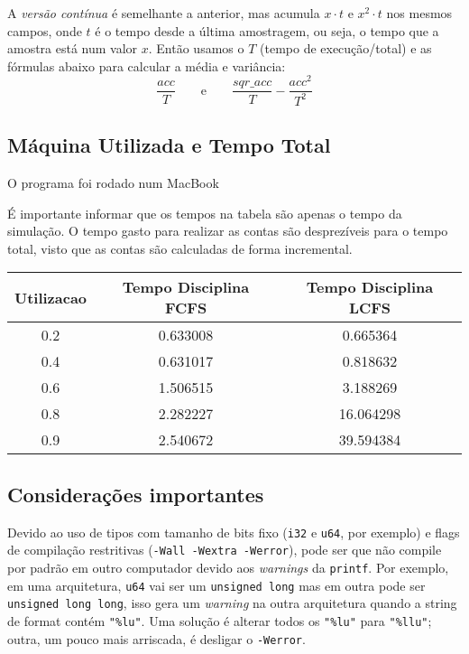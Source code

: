 \documentclass[a4paper]{article}
\newcommand{\inlcode}{\texttt}
\begin{document}
A \emph{versão contínua} é semelhante a anterior,
mas acumula \(x \cdot t\) e \(x^2 \cdot t\) nos mesmos campos,
onde \(t\) é
o tempo desde a última amostragem, ou seja,
o tempo que a amostra está num valor \(x\).
Então usamos o \(T\) (tempo de execução/total)
e as fórmulas abaixo para calcular a média e variância:
\[
    \frac{acc}{T}
    \qquad\text{e}\qquad
    \frac{sqr\_acc}{T} - \frac{acc^2}{T^2}
\]

\subsection{Máquina Utilizada e Tempo Total}
O programa foi rodado num MacBook

É importante informar que os tempos na tabela são apenas o tempo da simulação. O tempo gasto para realizar as contas são desprezíveis para o tempo total, visto que as contas são calculadas de forma incremental.


\begin{center} \begin{tabular}{|c|c|c|}
    \hline
     Utilizacao & Tempo Disciplina FCFS & Tempo Disciplina LCFS\\
    \hline
    0.2 & 0.633008 & 0.665364 \\
    \hline
    0.4 & 0.631017 & 0.818632 \\
    \hline
    0.6 & 1.506515 & 3.188269 \\
    \hline
    0.8 & 2.282227 & 16.064298 \\
    \hline
    0.9 & 2.540672 & 39.594384 \\
    \hline
\end{tabular} \end{center}


\subsection{Considerações importantes}

Devido ao uso de tipos com tamanho de bits fixo
(\inlcode{i32} e \inlcode{u64}, por exemplo)
e flags de compilação restritivas (\inlcode{-Wall -Wextra -Werror}),
pode ser que não compile por padrão em outro computador
devido aos \emph{warnings} da \inlcode{printf}.
Por exemplo, em uma arquitetura,
\inlcode{u64} vai ser um \inlcode{unsigned long}
mas em outra pode ser \inlcode{unsigned long long},
isso gera um \emph{warning} na outra arquitetura
quando a string de format contém \verb."%lu"..
Uma solução é alterar todos os
\verb."%lu". para \verb."%llu".;
outra, um pouco mais arriscada,
é desligar o \inlcode{-Werror}.
\end{document}
